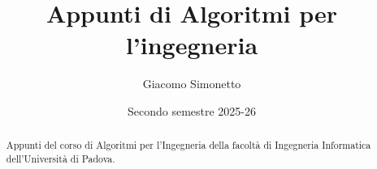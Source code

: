 \documentclass[a4paper]{article}
\title{Appunti di Algoritmi per l'ingegneria}
\author{Giacomo Simonetto}
\date{Secondo semestre 2025-26}
\begin{document}
\maketitle
\begin{abstract}
	Appunti del corso di Algoritmi per l'Ingegneria della facoltà di Ingegneria Informatica dell'Università di Padova.
\end{abstract}

\newpage

\tableofcontents

\newpage










\end{document}
